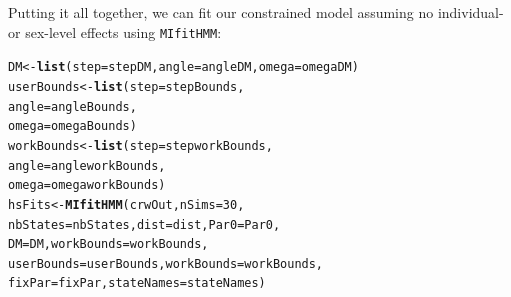 \documentclass[12pt]{article}\usepackage[]{graphicx}\usepackage[]{xcolor}
\makeatletter
\newcommand{\hlnum}[1]{\textcolor[rgb]{0.686,0.059,0.569}{#1}}%
\newcommand{\hldef}[1]{\textcolor[rgb]{0.345,0.345,0.345}{#1}}%
\newcommand{\hlkwb}[1]{\textcolor[rgb]{0.69,0.353,0.396}{#1}}%
\newcommand{\hlkwc}[1]{\textcolor[rgb]{0.333,0.667,0.333}{#1}}%
\newcommand{\hlkwd}[1]{\textcolor[rgb]{0.737,0.353,0.396}{\textbf{#1}}}%
\newenvironment{kframe}{%
 \def\at@end@of@kframe{}%
 \ifinner\ifhmode%
  \def\at@end@of@kframe{\end{minipage}}%
  \begin{minipage}{\columnwidth}%
 \fi\fi%
 \def\FrameCommand##1{\hskip\@totalleftmargin \hskip-\fboxsep
 \colorbox{shadecolor}{##1}\hskip-\fboxsep
     \hskip-\linewidth \hskip-\@totalleftmargin \hskip\columnwidth}%
 \MakeFramed {\advance\hsize-\width
   \@totalleftmargin\z@ \linewidth\hsize
   \@setminipage}}%
 {\par\unskip\endMakeFramed%
 \at@end@of@kframe}
\newenvironment{knitrout}{}{} %
\makeatother
\begin{document}
Putting it all together, we can fit our constrained model assuming no individual- or sex-level effects using \verb|MIfitHMM|:
\begin{knitrout}
\color{fgcolor}\begin{kframe}
\begin{alltt}
\hldef{DM} \hlkwb{<-} \hlkwd{list}\hldef{(}\hlkwc{step} \hldef{= stepDM,} \hlkwc{angle} \hldef{= angleDM,} \hlkwc{omega} \hldef{= omegaDM)}
\hldef{userBounds} \hlkwb{<-} \hlkwd{list}\hldef{(}\hlkwc{step} \hldef{= stepBounds,}
                   \hlkwc{angle} \hldef{= angleBounds,}
                   \hlkwc{omega} \hldef{= omegaBounds)}
\hldef{workBounds} \hlkwb{<-} \hlkwd{list}\hldef{(}\hlkwc{step} \hldef{= stepworkBounds,}
                   \hlkwc{angle} \hldef{= angleworkBounds,}
                   \hlkwc{omega} \hldef{= omegaworkBounds)}
\hldef{hsFits} \hlkwb{<-} \hlkwd{MIfitHMM}\hldef{(crwOut,} \hlkwc{nSims} \hldef{=} \hlnum{30}\hldef{,}
                   \hlkwc{nbStates} \hldef{= nbStates,} \hlkwc{dist} \hldef{= dist,} \hlkwc{Par0} \hldef{= Par0,}
                   \hlkwc{DM} \hldef{= DM,} \hlkwc{workBounds} \hldef{= workBounds,}
                   \hlkwc{userBounds} \hldef{= userBounds,} \hlkwc{workBounds} \hldef{= workBounds,}
                   \hlkwc{fixPar} \hldef{= fixPar,} \hlkwc{stateNames} \hldef{= stateNames)}
\end{alltt}
\end{kframe}
\end{knitrout}
\end{document}
